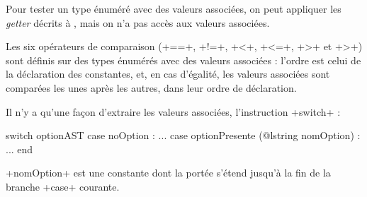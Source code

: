 Pour tester un type énuméré avec des valeurs associées, on peut appliquer les \emph{getter} décrits à , mais on n'a pas accès aux valeurs associées.

Les six opérateurs de comparaison (\ggs+==+, \ggs+!=+, \ggs+<+, \ggs+<=+, \ggs+>+ et \ggs+>+) sont définis sur des types énumérés avec des valeurs associées : l'ordre est celui de la déclaration des constantes, et, en cas d'égalité, les valeurs associées sont comparées les unes après les autres, dans leur ordre de déclaration.

Il n'y a qu'une façon d'extraire les valeurs associées, l'instruction \ggs+switch+ :

\begin{galgas}
switch optionAST
case noOption : ...
case optionPresente (@lstring nomOption) : ...
end
\end{galgas}

\ggs+nomOption+ est une constante dont la portée s'étend jusqu'à la fin de la branche \ggs+case+ courante.
 
